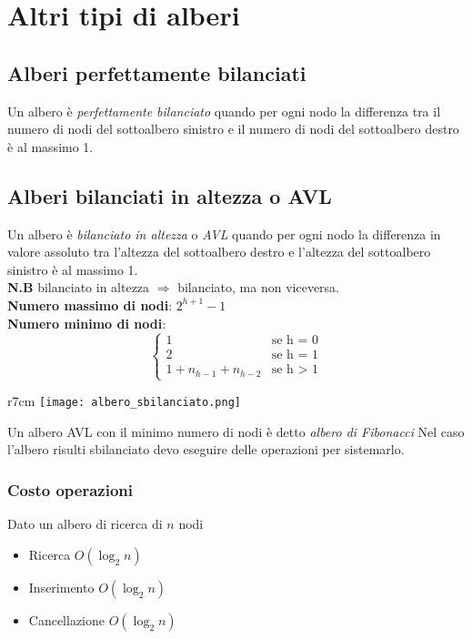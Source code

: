 \section{Altri tipi di alberi}
\subsection{Alberi perfettamente bilanciati}
Un albero è \emph{perfettamente bilanciato} quando per ogni nodo la differenza tra il 
numero di nodi del sottoalbero sinistro e il numero di nodi del sottoalbero destro
è al massimo 1.
\subsection{Alberi bilanciati in altezza o AVL}
Un albero è \emph{bilanciato in altezza} o \emph{AVL} quando per ogni nodo la differenza
in valore assoluto tra l'altezza del sottoalbero destro e l'altezza del sottoalbero sinistro è
al massimo 1.\\
\textbf{N.B} bilanciato in altezza $\Rightarrow$ bilanciato, ma non viceversa.\\
\textbf{Numero massimo di nodi}: $2^{h+1} - 1$\\[20pt]
\textbf{Numero minimo di nodi}:
\begin{equation*}
    \begin{cases}
        1 & \text{se h = 0}\\
        2 & \text{se h = 1}\\
        1 + n_{h-1}+n_{h-2} & \text{se h $>$ 1}
    \end{cases}
\end{equation*}
\begin{wrapfigure}{r}{7cm}
    \texttt{[image: albero\_sbilanciato.png]}
\end{wrapfigure}
Un albero AVL con il minimo numero di nodi è detto \emph{albero di Fibonacci}
Nel caso l'albero risulti sbilanciato devo eseguire delle operazioni per sistemarlo.

\subsubsection*{Costo operazioni}
Dato un albero di ricerca di $n$ nodi
\begin{itemize}
    \item Ricerca $O(\log_2 n)$
    \item Inserimento $O(\log_2 n)$
    \item Cancellazione $O(\log_2 n)$
\end{itemize}

